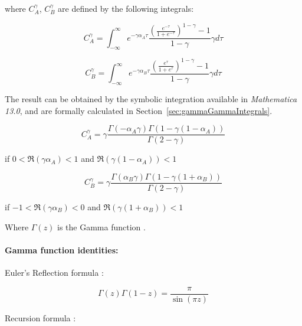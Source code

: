 \documentclass{article}
\theoremstyle{definition}
\begin{document}
where $C^\gamma_A$, $C^\gamma_B$ are defined by the following integrals:

\begin{equation}
    \label{eq:CA_gamma}
    C^\gamma_A = \int_{-\infty}^\infty e^{-\gamma \alpha_A \tau} 
    \frac{\left ( \frac{e^{-\tau}}{1 + e^{-\tau}} \right )^{1-\gamma}-1}{1-\gamma} 
    \gamma d \tau
\end{equation}

\begin{equation}
    \label{eq:CB_gamma}
    C^\gamma_B = \int_{-\infty}^\infty e^{-\gamma \alpha_B \tau}
    \frac{\left ( \frac{e^{\tau}}{1 + e^{\tau}} \right )^{1-\gamma}-1}{1-\gamma} 
    \gamma d \tau
\end{equation}

The result can be obtained by the symbolic integration \cite{tool:WolframIntegrate} available in \textit{Mathematica 13.0}, and are formally calculated in Section~\ref{sec:gammaGammaIntegrals}.

\begin{equation}
    C^\gamma_A = \gamma \frac{\Gamma(-\alpha_A \gamma) \Gamma(1-\gamma(1-\alpha_A))}{\Gamma(2-\gamma)}
\end{equation}

if $0 < \Re(\gamma \alpha_A) < 1$ and $\Re(\gamma (1-\alpha_A)) < 1 $

\begin{equation}
    C^\gamma_B = \gamma \frac{\Gamma(\alpha_B \gamma) \Gamma(1-\gamma(1+\alpha_B))}{\Gamma(2-\gamma)}
\end{equation}

if $-1 < \Re(\gamma \alpha_B) < 0$ and $\Re(\gamma (1+\alpha_B)) < 1 $

Where $\Gamma(z)$ is the Gamma function \cite{book:SeymourMathematicalHandbook, book:Bronshtein, book:NISThandbook, book:Abramowitz, book:HigherTranscendentalFunctions}.

\paragraph{Gamma function identities:}

Euler's Reflection formula \cite{book:SeymourMathematicalHandbook}:

\begin{equation}
    \Gamma(z) \Gamma(1-z) = \frac{\pi}{\sin(\pi z)}
\end{equation}

Recursion formula \cite{book:SeymourMathematicalHandbook}:
\end{document}
